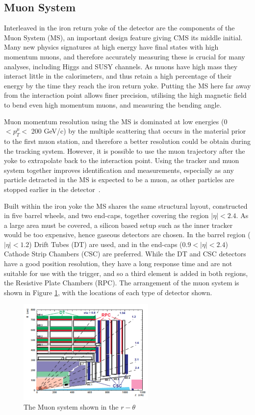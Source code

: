 \subsection{Muon System}

Interleaved in the iron return yoke of the detector are the components of the Muon System (MS), an important design feature giving CMS its middle initial. Many new physics signatures at high energy have final states with high momentum muons, and therefore accurately measuring these is crucial for many analyses, including Higgs and SUSY channels. As muons have high mass they interact little in the calorimeters, and thus retain a high percentage of their energy by the time they reach the iron return yoke. Putting the MS here far away from the interaction point allows finer precision, utilising the high magnetic field to bend even high momentum muons, and measuring the bending angle.

Muon momentum resolution using the MS is dominated at low energies (0 $< p^{\mu}_{T} < $ 200 GeV/c) by the multiple scattering that occurs in the material prior to the first muon station, and therefore a better resolution could be obtain during the tracking system. However, it is possible to use the muon trajectory after the yoke to extrapolate back to the interaction point. Using the tracker and muon system together improves identification and measurements, especially as any particle detracted in the MS is expected to be a muon, as other particles are stopped earlier in the detector~\cite{MuonTDR}. 

Built within the iron yoke the MS shares the same structural layout, constructed in five barrel wheels, and two end-caps, together covering the region $|\eta| < 2.4$. As a large area must be covered, a silicon based setup such as the inner tracker would be too expensive, hence gaseous detectors are chosen. In the barrel region ($|\eta| < 1.2$) Drift Tubes (DT) are used, and in the end-caps ($0.9 < |\eta| < 2.4$) Cathode Strip Chambers (CSC) are preferred. While the DT and CSC detectors have a good position resolution, they have a long response time and are not suitable for use with the trigger, and so a third element is added in both regions, the Resistive Plate Chambers (RPC). The arrangement of the muon system is shown in Figure \ref{fig:MuonSystem}, with the locations of each type of detector shown.

\begin{figure}
\centering
\includegraphics[width=0.6\textwidth]{Figures/Detector/MS}
\caption{The Muon system shown in the $r-\theta$}
\label{fig:MuonSystem}
\end{figure}

